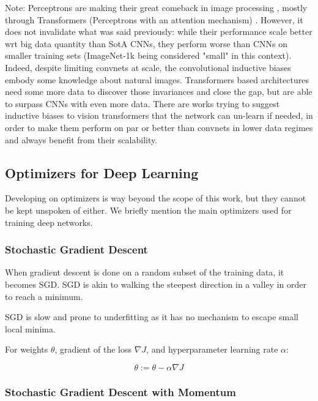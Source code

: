 Note: Perceptrons are making their great comeback in image processing \citep{mlpmixer}, mostly through Transformers (Perceptrons with an attention mechanism) \citep{transformers,vit}. However, it does not invalidate what was said previously: while their performance scale better wrt big data quantity than \ac{SotA} \acp{CNN}, they perform worse than \acp{CNN} on smaller training sets (ImageNet-1k being considered "small" in this context). Indeed, despite limiting convnets at scale, the convolutional inductive biases embody some knowledge about natural images. Transformers based architectures need some more data to discover those invariances and close the gap, but are able to surpass \acp{CNN} with even more data. There are works trying to suggest inductive biases to vision transformers that the network can un-learn if needed, in order to make them perform on par or better than convnets in lower data regimes \citep{convit,coatnet} and always benefit from their scalability.

\subsection{Optimizers for Deep Learning}

Developing on optimizers is way beyond the scope of this work, but they cannot be kept unspoken of either. We briefly mention the main optimizers used for training deep networks.

\subsubsection{Stochastic Gradient Descent}

When gradient descent is done on a random subset of the training data, it becomes \ac{SGD}. \ac{SGD} is akin to walking the steepest direction in a valley in order to reach a minimum.

\ac{SGD} is slow and prone to underfitting as it has no mechanism to escape small local minima.

For weights $\theta$, gradient of the loss $\nabla J$, and hyperparameter learning rate $\alpha$:

\begin{equation}
    \theta := \theta - \alpha \nabla J
\end{equation}

\subsubsection{Stochastic Gradient Descent with Momentum}

